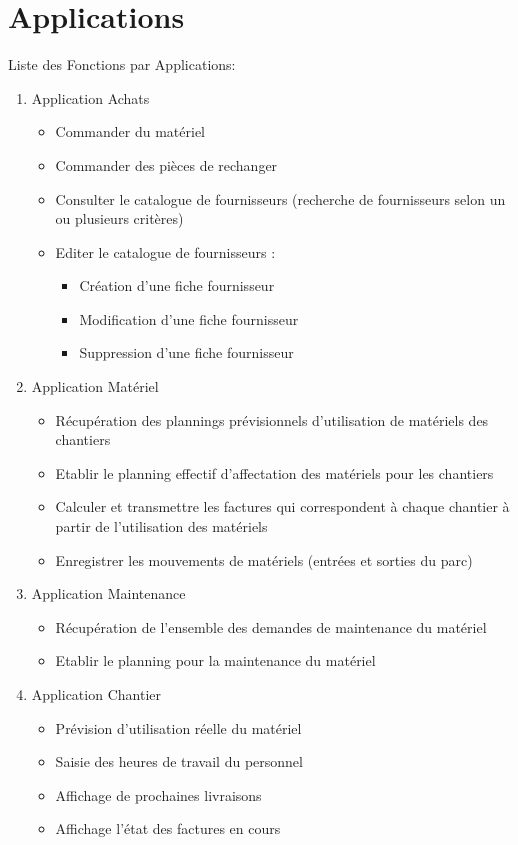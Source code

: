 \documentclass [a4paper] {report}
\begin{document}
\section{Applications}

Liste des Fonctions par Applications:

\begin{enumerate}

\item Application Achats
\begin{itemize}
\item Commander du matériel
\item Commander des pièces de rechanger
\item Consulter le catalogue de fournisseurs (recherche de fournisseurs selon 
un ou plusieurs critères)
\item Editer le catalogue de fournisseurs :
	\begin{itemize}
	\item Création d'une fiche fournisseur
	\item Modification d'une fiche fournisseur
	\item Suppression d'une fiche fournisseur
	\end{itemize}
\end{itemize}

\item Application Matériel
\begin{itemize}
\item Récupération des plannings prévisionnels d'utilisation de matériels des chantiers
\item Etablir le planning effectif d'affectation des matériels pour les chantiers
\item Calculer et transmettre les factures qui correspondent à chaque chantier
à partir de l'utilisation des matériels
\item Enregistrer les mouvements de matériels (entrées et sorties du parc)
\end{itemize}

\item Application Maintenance
\begin{itemize}
\item Récupération de l'ensemble des demandes de maintenance du matériel
\item Etablir le planning pour la maintenance du matériel
\end{itemize}

\item Application Chantier
\begin{itemize}
\item Prévision d'utilisation réelle du matériel
\item Saisie des heures de travail du personnel
\item Affichage de prochaines livraisons
\item Affichage l'état des factures en cours
\end{itemize}

\end{enumerate}
\end{document}
